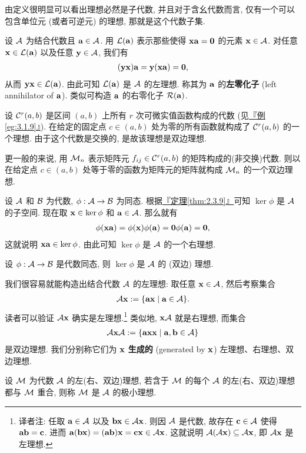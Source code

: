 \documentclass[lang=cn,zihao=-4,twoside,fontset=none]{textbook}
\def\eq#1{\[\begin{aligned}{}#1\end{aligned}\]}
\newcommand{\thmref}[1]{\hyperref[#1]{『定理\textnormal{\ref*{#1}}』}}
\newcommand{\egref}[1]{\hyperref[#1]{『例\textnormal{\ref*{#1}}』}}
\newcommand{\set}[1]{\{#1\}}
\newcommand{\bfnull}{\mathbf{0}}
\begin{document}
由定义很明显可以看出理想必然是子代数, 并且对于含幺代数而言, 仅有一个可以包含单位元 (或者可逆元) 的理想, 那就是这个代数子集. 

\begin{exam}
    \label{eg:3.2.2}%
    设 ${\mathcal A}$ 为结合代数且 ${\mathbf a}\in{\mathcal A}$. 用 ${\mathcal L}({\mathbf a})$ 表示那些使得 $\bfx\bfa=\bfnull$ 的元素 ${\mathbf x}\in{\mathcal A}$. 对任意 ${\mathbf x}\in{\mathcal L}({\mathbf a})$ 以及任意 ${\mathbf y}\in{\mathcal A}$, 我们有 
    \eq{
        (\bfy\bfx)\bfa=\bfy(\bfx\bfa)=\bfnull,
    }
    从而 ${\mathbf y}{\mathbf x}\in{\mathcal L}({\mathbf a})$. 由此可知 ${\mathcal L}({\mathbf a})$ 是 ${\mathcal A}$ 的左理想. 称其为 ${\mathbf a}$ 的\textbf{左零化子} (left annihilator of ${\mathbf a}$). 类似可构造 ${\mathbf a}$ 的右零化子 ${\mathcal R}({\mathbf a})$.
\end{exam}

\begin{exam}
    \label{eg:3.2.3}%
    设 ${\mathcal C}^r(a,b)$ 是区间 $(a,b)$ 上所有 $r$ 次可微实值函数构成的代数 (见\egref{eg:3.1.9}). 在给定的固定点 $c\in(a,b)$ 处为零的所有函数就构成了 ${\mathcal C}^r(a,b)$ 的一个理想. 由于这个代数是交换的, 是故该理想是双边理想.

    更一般的来说, 用 ${\mathcal M}_n$ 表示矩阵元 $f_{ij}\in{\mathcal C}^r(a,b)$ 的矩阵构成的(非交换)代数. 则以在给定点 $c\in(a,b)$ 处等于零的函数为矩阵元的矩阵就构成 ${\mathcal M}_n$ 的一个双边理想.  
\end{exam}

设 ${\mathcal A}$ 和 ${\mathcal B}$ 为代数, $\phi:{\mathcal A}\to{\mathcal B}$ 为同态. 根据\thmref{thm:2.3.9}可知 $\ker\phi$ 是 ${\mathcal A}$ 的子空间. 现在取 ${\mathbf x}\in\ker\phi$ 和 ${\mathbf a}\in{\mathcal A}$. 那么就有 
\eq{
    \phi(\bfx\bfa)=\phi(\bfx)\phi(\bfa)=\bfnull\phi(\bfa)=\bfnull,
}
这就说明 ${\mathbf x}{\mathbf a}\in\ker\phi$. 由此可知 $\ker\phi$ 是 ${\mathcal A}$ 的一个右理想. 

\begin{theorem}
    \label{thm:3.2.4}%
    设 $\phi:{\mathcal A}\to{\mathcal B}$ 是代数同态, 则 $\ker\phi$ 是 ${\mathcal A}$ 的 (双边) 理想.
\end{theorem}

我们很容易就能构造出结合代数 ${\mathcal A}$ 的左理想: 取任意 ${\mathbf x}\in{\mathcal A}$, 然后考察集合 
\eq{
    \mA\bfx:= \set{\bfa\bfx\mid \bfa\in\mA}.
}
读者可以验证 ${\mathcal A}{\mathbf x}$ 确实是左理想.\footnote{译者注: 任取 ${\mathbf a}\in{\mathcal A}$ 以及 ${\mathbf b}{\mathbf x}\in{\mathcal A}{\mathbf x}$. 则因 ${\mathcal A}$ 是代数, 故存在 ${\mathbf c}\in{\mathcal A}$ 使得 ${\mathbf a}{\mathbf b}={\mathbf c}$. 进而 ${\mathbf a}({\mathbf b}{\mathbf x})=({\mathbf a}{\mathbf b}){\mathbf x}={\mathbf c}{\mathbf x}\in{\mathcal A}{\mathbf x}$. 这就说明 ${\mathcal A}({\mathcal A}{\mathbf x})\subseteq{\mathcal A}{\mathbf x}$, 即 ${\mathcal A}{\mathbf x}$ 是左理想.} 类似地, ${\mathbf x}{\mathcal A}$ 就是右理想, 而集合 
\eq{
    \mA\bfx\mA := \set{\bfa\bfx\bfx\mid \bfa,\bfb\in\mA}
}
是双边理想. 我们分别称它们为 ${\mathbf x}$ \textbf{生成的} (generated by ${\mathbf x}$) 左理想、右理想、双边理想.

\begin{defi}
    [极小理想]\label{def:3.2.5}%
    设 ${\mathcal M}$ 为代数 ${\mathcal A}$ 的左(右、双边)理想, 若含于 ${\mathcal M}$ 的每个 ${\mathcal A}$ 的左(右、双边)理想都与 ${\mathcal M}$ 重合, 则称 ${\mathcal M}$ 是 ${\mathcal A}$ 的极小理想.
\end{defi}
\end{document}
